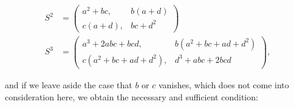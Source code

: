 \[
\begin{aligned}
S^2 &= \begin{pmatrix} a^2 + bc, & b(a+d) \\ c(a+d), & bc + d^2 \end{pmatrix} \\
S^3 &= \begin{pmatrix} a^3 + 2abc + bcd, & b(a^2+bc+ad+d^2) \\ c(a^2+bc+ad+d^2), & d^3+abc+2bcd \end{pmatrix},
\end{aligned}
\]

and if we leave aside the case that $b$ or $c$ vanishes,
which does not come into consideration here, we obtain the
necessary and sufficient condition:
